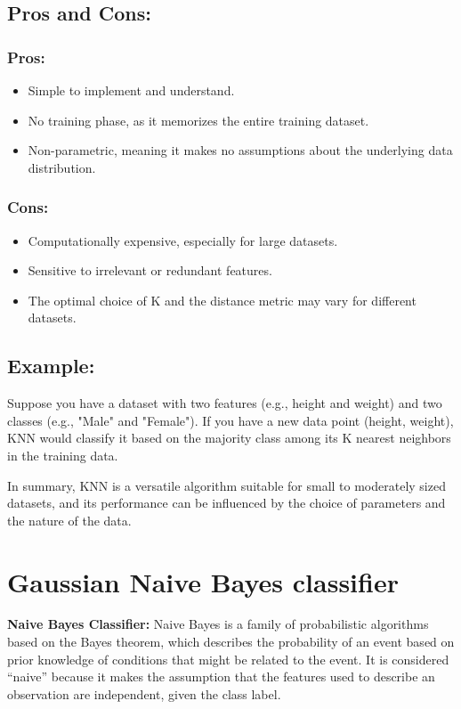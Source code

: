 \documentclass[9pt,twocolumn]{paper-template}
\begin{document}
\subsection*{Pros and Cons:}
\subsubsection*{Pros:}
\begin{itemize}
	\item Simple to implement and understand.
	\item No training phase, as it memorizes the entire training dataset.
	\item Non-parametric, meaning it makes no assumptions about the underlying data distribution.
\end{itemize}

\subsubsection*{Cons:}
\begin{itemize}
	\item Computationally expensive, especially for large datasets.
	\item Sensitive to irrelevant or redundant features.
	\item The optimal choice of K and the distance metric may vary for different datasets.
\end{itemize}

\subsection*{Example:}
Suppose you have a dataset with two features (e.g., height and weight) and two classes (e.g., "Male" and "Female"). If you have a new data point (height, weight), KNN would classify it based on the majority class among its K nearest neighbors in the training data.

In summary, KNN is a versatile algorithm suitable for small to moderately sized datasets, and its performance can be influenced by the choice of parameters and the nature of the data.



\section*{Gaussian Naive Bayes classifier}





\textbf{Naive Bayes Classifier:}
Naive Bayes is a family of probabilistic algorithms based on the Bayes theorem, which describes the probability of an event based on prior knowledge of conditions that might be related to the event. It is considered ``naive'' because it makes the assumption that the features used to describe an observation are independent, given the class label.
\end{document}
